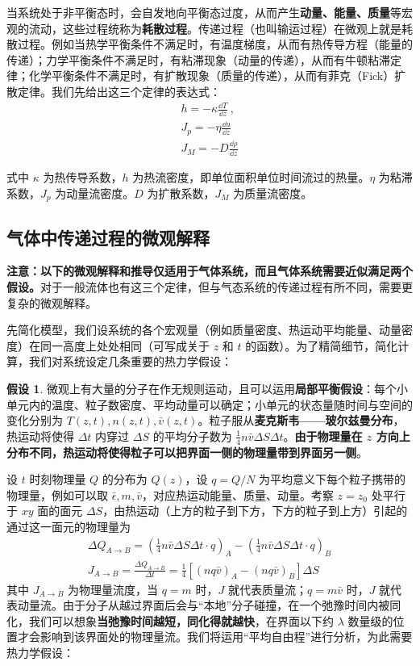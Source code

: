 

当系统处于非平衡态时，会自发地向平衡态过度，从而产生\textbf{动量、能量、质量}等宏观的流动，这些过程统称为\textbf{耗散过程}。传递过程（也叫输运过程）在微观上就是耗散过程。例如当热学平衡条件不满足时，有温度梯度，从而有热传导方程（能量的传递）；力学平衡条件不满足时，有粘滞现象（动量的传递），从而有牛顿粘滞定律；化学平衡条件不满足时，有扩散现象（质量的传递），从而有菲克（Fick）扩散定律。我们先给出这三个定律的表达式：
\begin{align}
h=-\kappa \frac{\dd T}{\dd z}~,\\
J_p=-\eta \frac{\dd u}{\dd z}\\
J_M=-D\frac{\dd \rho}{\dd z}
\end{align}

式中 $\kappa$ 为热传导系数，$h$ 为热流密度，即单位面积单位时间流过的热量。$\eta$ 为粘滞系数，$J_p$ 为动量流密度。$D$ 为扩散系数，$J_M$ 为质量流密度。

\subsection{气体中传递过程的微观解释}
\textbf{注意：以下的微观解释和推导仅适用于\textbf{气体系统}，而且气体系统需要近似满足两个假设。}对于一般流体也有这三个定律，但与气态系统的传递过程有所不同，需要更复杂的微观解释。

先简化模型，我们设系统的各个宏观量（例如质量密度、热运动平均能量、动量密度）在同一高度上处处相同（可写成关于 $z$ 和 $t$ 的函数）。为了精简细节，简化计算，我们对系统设定几条重要的热力学假设：

\textbf{假设 1}. 微观上有大量的分子在作无规则运动，且可以运用\textbf{局部平衡假设}：每个小单元内的温度、粒子数密度、平均动量可以确定；小单元的状态量随时间与空间的变化分别为 $T(z,t),n(z,t),\bar v(z,t)$。粒子服从\textbf{麦克斯韦——玻尔兹曼分布}，热运动将使得 $\Delta t$ 内穿过 $\Delta S$ 的平均分子数为 $\frac{1}{4}n\bar v \Delta S\Delta t$。\textbf{由于物理量在 $z$ 方向上分布不同，热运动将使得粒子可以把界面一侧的物理量带到界面另一侧}。

设 $t$ 时刻物理量 $Q$ 的分布为 $Q(z)$，设 $q=Q/N$ 为平均意义下每个粒子携带的物理量，例如可以取 $\bar \epsilon,m,\bar v$，对应热运动能量、质量、动量。考察 $z=z_0$ 处平行于 $xy$ 面的面元 $\Delta S$，由热运动（上方的粒子到下方，下方的粒子到上方）引起的通过这一面元的物理量为
\begin{align}
\Delta Q_{A\rightarrow B}=(\frac{1}{4}n\bar v \Delta S\Delta t\cdot q)_A-(\frac{1}{4}n\bar v \Delta S\Delta t\cdot q)_B
\\
J_{A\rightarrow B}=\frac{\Delta Q_{A\rightarrow B}}{\Delta t}=\frac{1}{4}[(nq\bar v)_A-(nq\bar v)_B]\Delta S
\end{align}
其中 $J_{A\rightarrow B}$ 为物理量流度，当 $q=m$ 时，$J$ 就代表质量流；$q=m\bar v$ 时，$J$ 就代表动量流。由于分子从越过界面后会与“本地”分子碰撞，在一个弛豫时间内被同化，我们可以想象\textbf{当弛豫时间越短，同化得就越快}，在界面以下约 $\lambda$ 数量级的位置才会影响到该界面处的物理量流。我们将运用“平均自由程”进行分析，为此需要热力学假设：

